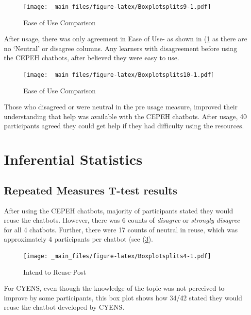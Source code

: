 \documentclass[a4paper, nobind]{templates/ociamthesis}
\begin{document}
\begin{figure}
\centering
\texttt{[image: \_main\_files/figure-latex/Boxplotsplits9-1.pdf]}
\caption{\label{fig:Boxplotsplits9}Ease of Use Comparison}
\end{figure}

After usage, there was only agreement in Ease of Use- as shown in
(\ref{fig:Boxplotsplits9} as there are no `Neutral' or disagree
columns. Any learners with disagreement before using the CEPEH chatbots,
after believed they were easy to use.

\begin{figure}
\centering
\texttt{[image: \_main\_files/figure-latex/Boxplotsplits10-1.pdf]}
\caption{\label{fig:Boxplotsplits10}Ease of Use Comparison}
\end{figure}

Those who disagreed or were neutral in the pre usage measure, improved
their understanding that help was available with the CEPEH chatbots.
After usage, 40 participants agreed they could get help if they had
difficulty using the resources.

\hypertarget{inferential-statistics}{%
\section{Inferential Statistics}\label{inferential-statistics}}

\hypertarget{repeated-measures-t-test-results}{%
\subsection{Repeated Measures T-test results}\label{repeated-measures-t-test-results}}

After using the CEPEH chatbots, majority of participants stated they
would reuse the chatbots. However, there was 6 counts of \emph{disagree} or
\emph{strongly disagree} for all 4 chatbots. Further, there were 17 counts of
neutral in reuse, which was approximately 4 participants per chatbot
(see (\ref{fig:Boxplotsplits4}).

\begin{figure}
\centering
\texttt{[image: \_main\_files/figure-latex/Boxplotsplits4-1.pdf]}
\caption{\label{fig:Boxplotsplits4}Intend to Reuse-Post}
\end{figure}

For CYENS, even though the knowledge of the topic was not perceived to
improve by some participants, this box plot shows how 34/42 stated they
would reuse the chatbot developed by CYENS.
\end{document}
